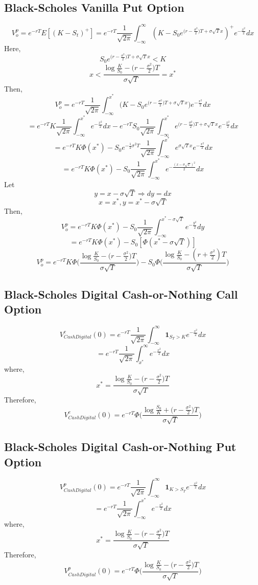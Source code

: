 \documentclass{article}
\begin{document}
\subsection{Black-Scholes Vanilla Put Option}
$$
V_o^{p} = e^{-rT}{E}[(K-S_t)^{+}]
= e^{-rT}\frac{1}{\sqrt{2\pi}}\int_{-\infty}^{\infty}(K-S_0e^{\big(r-\frac{\sigma^{2}}{2}\big)T +\sigma\sqrt{T}x})^{+}e^{-\frac{x^{2}}{2}}dx
$$
Here, 
$$S_0e^{\big(r-\frac{\sigma^{2}}{2}\big)T +\sigma\sqrt{T}x} < K$$
$$ 
x < \frac{\log{\frac{K}{S_0}}-\big(r-\frac{\sigma^{2}}{2}\big)T}{\sigma\sqrt{T}} = x^{*}
$$
Then,
$$
V_o^{p} = e^{-rT}\frac{1}{\sqrt{2\pi}}\int_{-\infty}^{x^{*}}\Big(K-S_0e^{\big(r-\frac{\sigma^{2}}{2}\big)T +\sigma\sqrt{T}x}\Big)e^{-\frac{x^{2}}{2}}dx
$$$$
= e^{-rT}K\frac{1}{\sqrt{2\pi}}\int_{-\infty}^{x^{*}}e^{-\frac{x^{2}}{2}}dx-e^{-rT}S_0\frac{1}{\sqrt{2\pi}}\int_{-\infty}^{x^{*}}e^{\big(r-\frac{\sigma^{2}}{2}\big)T+\sigma\sqrt{T}x}e^{-\frac{x^{2}}{2}}dx
$$$$
=e^{-rT}K\Phi(x^{*})-S_0e^{-\frac{1}{2}\sigma^{2}T}\frac{1}{\sqrt{2\pi}}\int_{-\infty}^{x^{*}}e^{\sigma\sqrt{T}x}e^{-\frac{x^{2}}{2}}dx
$$$$
=e^{-rT}K\Phi(x^{*})-S_0\frac{1}{\sqrt{2\pi}}\int_{-\infty}^{x^{*}}e^{-\frac{(x-\sigma\sqrt{T})^{2}}{2}}dx
$$
Let 
$$y = x-\sigma\sqrt{T} \Rightarrow dy=dx$$
$$x = x^{*}, y = x^{*}-\sigma\sqrt{T}$$
Then,
$$
V_o^{p} = e^{-rT}K\Phi(x^{*}) - S_0\frac{1}{\sqrt{2\pi}}\int_{-\infty}^{x^{*}-\sigma\sqrt{T}}e^{-\frac{y^{2}}{2}}dy
$$$$
= e^{-rT}K\Phi(x^{*}) - S_0[\Phi(x^{*}-\sigma\sqrt{T})]
$$$$
V_o^{p} = e^{-rT}K\Phi\Bigg(\frac{\log{\frac{K}{S_0}}-\big(r-\frac{\sigma^{2}}{2}\big)T}{\sigma\sqrt{T}}\Bigg) - S_0\Phi\Bigg(\frac{\log{\frac{K}{S_0}}-(r+\frac{\sigma^{2}}{2})T}{\sigma\sqrt{T}}\Bigg)
$$

\subsection{Black-Scholes Digital Cash-or-Nothing Call Option}
$$
V^{c}_{Cash Digital}(0) = e^{-rT}\frac{1}{\sqrt{2\pi}}\int_{-\infty}^{\infty}\mathbf{1}_{S_T>K}e^{-\frac{x^{2}}{2}}dx
$$
$$
= e^{-rT}\frac{1}{\sqrt{2\pi}}\int_{x^{*}}^{\infty}e^{-\frac{x^{2}}{2}}dx
$$
where,
$$
x^{*} = \frac{\log{\frac{K}{S_0}}-\big(r-\frac{\sigma^{2}}{2}\big)T}{\sigma\sqrt{T}} 
$$
Therefore,
$$
V^{c}_{Cash Digital}(0) = e^{-rT}\Phi\Bigg(\frac{\log{\frac{S_0}{K}}+\big(r-\frac{\sigma^{2}}{2}\big)T}{\sigma\sqrt{T}} \Bigg)
$$

\subsection{Black-Scholes Digital Cash-or-Nothing Put Option}
$$
V^{p}_{Cash Digital}(0) = e^{-rT}\frac{1}{\sqrt{2\pi}}\int_{-\infty}^{\infty}\mathbf{1}_{K>S_T}e^{-\frac{x^{2}}{2}}dx
$$
$$
= e^{-rT}\frac{1}{\sqrt{2\pi}}\int_{-\infty}^{x^{*}}e^{-\frac{x^{2}}{2}}dx
$$
where,
$$
x^{*} = \frac{\log{\frac{K}{S_0}}-\big(r-\frac{\sigma^{2}}{2}\big)T}{\sigma\sqrt{T}} 
$$
Therefore,
$$
V^{p}_{Cash Digital}(0) = e^{-rT}\Phi\Bigg(\frac{\log{\frac{K}{S_0}}-\big(r-\frac{\sigma^{2}}{2}\big)T}{\sigma\sqrt{T}} \Bigg)
$$
\end{document}
